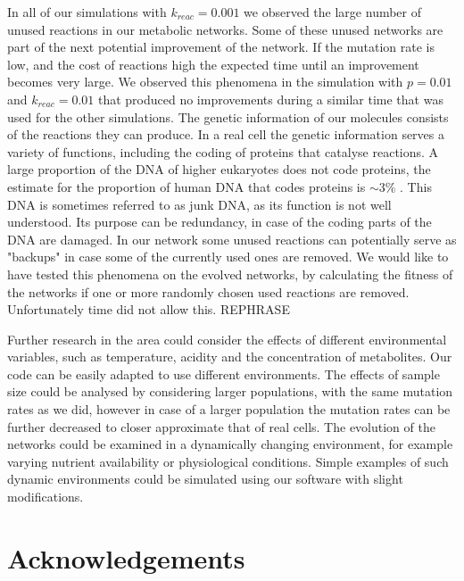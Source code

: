 \documentclass[a4paper,12pt]{article}
\begin{document}
	In all of our simulations with $k_{reac}=0.001$ we observed the large number of unused reactions in our metabolic networks. Some of these unused networks are part of the next potential improvement of the network. If the mutation rate is low, and the cost of reactions high the expected time until an improvement becomes very large. We observed this phenomena in the simulation with $p=0.01$ and $k_{reac}=0.01$ that produced no improvements during a similar time that was used for the other simulations. The genetic information of our molecules consists of the reactions they can produce. In a real cell the genetic information serves a variety of functions, including the coding of proteins that catalyse reactions. A large proportion of the DNA of higher eukaryotes does not code proteins, the estimate for the proportion of human DNA that codes proteins is $\sim 3\%$ \cite{junkdna}. This DNA is sometimes referred to as junk DNA, as its function is not well understood. Its purpose can be redundancy, in case of the coding parts of the DNA are damaged. In our network some unused reactions can potentially serve as "backups" in case some of the currently used ones are removed. We would like to have tested this phenomena on the evolved networks, by calculating the fitness of the networks if one or more randomly chosen used reactions are removed. Unfortunately time did not allow this. REPHRASE
	
	
	
	Further research in the area could consider the effects of different environmental variables, such as temperature, acidity and the concentration of metabolites. Our code can be easily adapted to use different environments. The effects of sample size could be analysed by considering larger populations, with the same mutation rates as we did, however in case of a larger population the mutation rates can be further decreased to closer approximate that of real cells. The evolution of the networks could be examined in a dynamically changing environment, for example varying nutrient availability or physiological conditions. Simple examples of such dynamic environments could be simulated using our software with slight modifications. 
	
	
	\section*{Acknowledgements}
	
\end{document}
